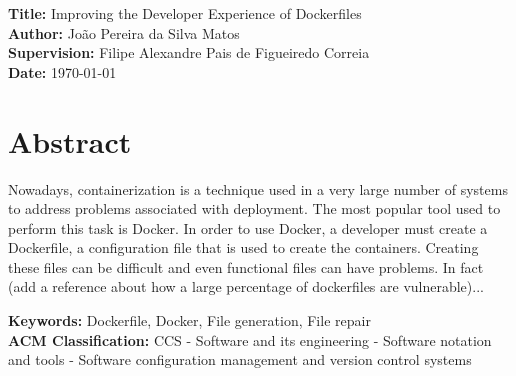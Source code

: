 \documentclass[11pt,a4paper]{article}
\newcommand{\titles}[2]{\noindent\textbf{#1:} #2\\[2mm]}
\begin{document}
\titles{Title}{Improving the Developer Experience of Dockerfiles}
\titles{Author}{João Pereira da Silva Matos}
\titles{Supervision}{Filipe Alexandre Pais de Figueiredo Correia}
\titles{Date}{\today}

\section*{Abstract}

Nowadays, containerization is a technique used in a very large number of systems to address problems associated with deployment. The most popular tool used to perform this task is Docker. In order to use Docker, a developer must create a Dockerfile, a configuration file that is used to create the containers. Creating these files can be difficult \cite{reisLiveDockerContainers2020} and even functional files can have problems. In fact (add a reference about how a large percentage of dockerfiles are vulnerable)...




\titles{Keywords}{Dockerfile, Docker, File generation, File repair}
\titles{ACM Classification}{CCS - Software and its engineering - Software notation and tools - Software configuration management and version control systems
}



\nocite{*}  %



\end{document}
